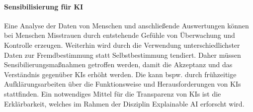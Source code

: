 \paragraph*{Sensibilisierung für KI} Eine Analyse der Daten von Menschen und anschließende Auswertungen können  bei Menschen Misstrauen durch entstehende Gefühle von Überwachung und Kontrolle erzeugen. Weiterhin wird durch die Verwendung unterschiedlichster Daten zur Fremdbestimmung statt Selbstbestimmung tendiert. Daher müssen Sensibilierungsmaßnahmen getroffen werden, damit die Akzeptanz und das Verständnis gegenüber KIs erhöht werden. Die kann  bspw. durch frühzeitige Aufklärungsarbeiten über die Funktionsweise und Herausforderungen von KIs stattfinden. Ein notwendiges Mittel für die Transparenz von KIs ist die Erklärbarkeit, welches im Rahmen der Disziplin Explainable AI erforscht wird. \cite*[S. 39ff.]{Witt.2020}
